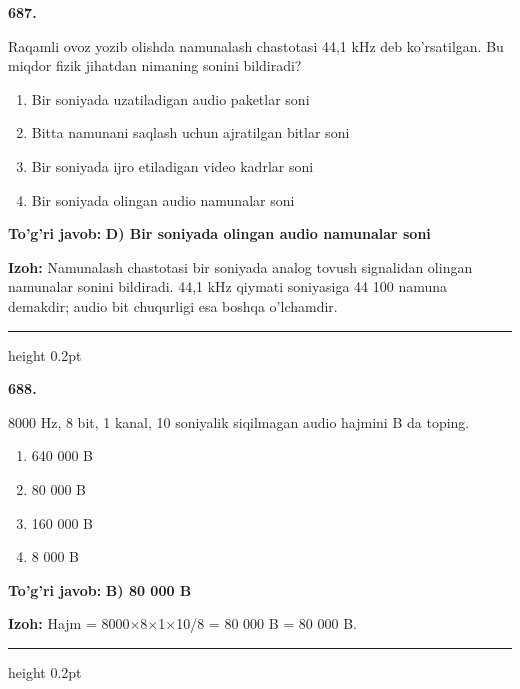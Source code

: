 \documentclass[10pt,a4paper,oneside]{article}
\begin{document}
\noindent\textbf{\color{ink}687.}
\par
Raqamli ovoz yozib olishda namunalash chastotasi 44,1 kHz deb ko'rsatilgan. Bu miqdor fizik jihatdan nimaning sonini bildiradi?
\begin{enumerate}[label=\Alph*),leftmargin=9mm]
\item Bir soniyada uzatiladigan audio paketlar soni
\item Bitta namunani saqlash uchun ajratilgan bitlar soni
\item Bir soniyada ijro etiladigan video kadrlar soni
\item Bir soniyada olingan audio namunalar soni
\end{enumerate}
\begin{tcolorbox}[enhanced,breakable,colback=teal!4,colframe=teal!50!black,boxrule=0.5pt,arc=1.1mm,left=3mm,right=3mm,top=1.7mm,bottom=1.7mm,before skip=2mm,after skip=2mm]
\textbf{\color{teal}To'g'ri javob:} \textbf{D) Bir soniyada olingan audio namunalar soni}
\par\smallskip
\textbf{Izoh:} Namunalash chastotasi bir soniyada analog tovush signalidan olingan namunalar sonini bildiradi. 44,1 kHz qiymati soniyasiga 44 100 namuna demakdir; audio bit chuqurligi esa boshqa o'lchamdir.
\end{tcolorbox}
\vspace{2mm}\hrule height 0.2pt \vspace{3mm}

\noindent\textbf{\color{ink}688.}
\par
8000 Hz, 8 bit, 1 kanal, 10 soniyalik siqilmagan audio hajmini B da toping.
\begin{enumerate}[label=\Alph*),leftmargin=9mm]
\item 640 000 B
\item 80 000 B
\item 160 000 B
\item 8 000 B
\end{enumerate}
\begin{tcolorbox}[enhanced,breakable,colback=teal!4,colframe=teal!50!black,boxrule=0.5pt,arc=1.1mm,left=3mm,right=3mm,top=1.7mm,bottom=1.7mm,before skip=2mm,after skip=2mm]
\textbf{\color{teal}To'g'ri javob:} \textbf{B) 80 000 B}
\par\smallskip
\textbf{Izoh:} Hajm = 8000\ensuremath{\times}8\ensuremath{\times}1\ensuremath{\times}10/8 = 80 000 B = 80 000 B.
\end{tcolorbox}
\vspace{2mm}\hrule height 0.2pt \vspace{3mm}
\end{document}
